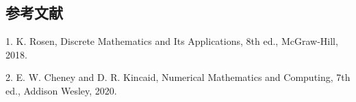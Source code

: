 \subsection{参考文献}
1. K. Rosen, Discrete Mathematics and Its Applications, 8th ed., McGraw-Hill, 2018.

2. E. W. Cheney and D. R. Kincaid, Numerical Mathematics and Computing, 7th ed., Addison Wesley, 2020.
